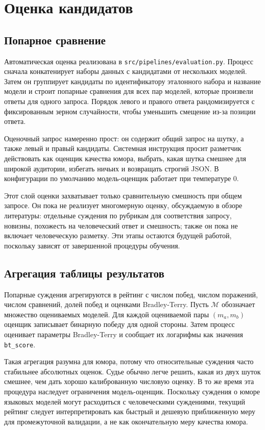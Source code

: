 \section{Оценка кандидатов}

\subsection{Попарное сравнение}

Автоматическая оценка реализована в \texttt{src/pipelines/evaluation.py}. Процесс сначала конкатенирует наборы данных с кандидатами от нескольких моделей. Затем он группирует кандидаты по идентификатору эталонного набора и название модели и строит попарные сравнения для всех пар моделей, которые произвели ответы для одного запроса. Порядок левого и правого ответа рандомизируется с фиксированным зерном случайности, чтобы уменьшить смещение из-за позиции ответа.

Оценочный запрос намеренно прост: он содержит общий запрос на шутку, а также левый и правый кандидаты. Системная инструкция просит разметчик действовать как оценщик качества юмора, выбрать, какая шутка смешнее для широкой аудитории, избегать ничьих и возвращать строгий JSON. В конфигурации по умолчанию модель-оценщик работает при температуре \(0\).

Этот слой оценки захватывает только сравнительную смешность при общем запросе. Он пока не реализует многомерную оценку, обсуждаемую в обзоре литературы: отдельные суждения по рубрикам для соответствия запросу, новизны, похожесть на человеческий ответ и смешность; также он пока не включает человеческую разметку. Эти этапы остаются будущей работой, поскольку зависят от завершенной процедуры обучения.

\subsection{Агрегация таблицы результатов}

Попарные суждения агрегируются в рейтинг с числом побед, числом поражений, числом сравнений, долей побед и оценками Bradley-Terry. Пусть \(\mathcal{M}\) обозначает множество оцениваемых моделей. Для каждой оцениваемой пары \((m_a,m_b)\) оценщик записывает бинарную победу для одной стороны. Затем процесс оценивает параметры Bradley-Terry и сообщает их логарифмы как значения \texttt{bt\_score}.

Такая агрегация разумна для юмора, потому что относительные суждения часто стабильнее абсолютных оценок. Судье обычно легче решить, какая из двух шуток смешнее, чем дать хорошо калиброванную числовую оценку. В то же время эта процедура наследует ограничения модель-оценщик. Поскольку суждения о юморе языковых моделей могут расходиться с человеческими суждениями, текущий рейтинг следует интерпретировать как быстрый и дешевую приближенную меру для промежуточной валидации, а не как окончательную меру качества юмора.

